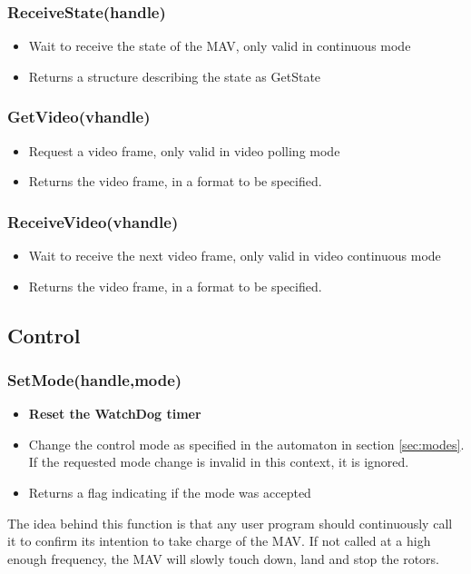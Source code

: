 \documentclass{article}
\begin{document}
\subsubsection{ReceiveState(handle)}
\begin{itemize}
\item Wait to receive the state of the MAV, only valid in continuous mode
\item Returns a structure describing the state as GetState
\end{itemize}

\subsubsection{GetVideo(vhandle)}
\begin{itemize}
\item Request a video frame, only valid in video polling mode
\item Returns the video frame, in a format to be specified.
\end{itemize}

\subsubsection{ReceiveVideo(vhandle)}
\begin{itemize}
\item Wait to receive the next video frame, only valid in video continuous mode
\item Returns the video frame, in a format to be specified.
\end{itemize}

\subsection{Control}
\subsubsection{SetMode(handle,mode)}
\begin{itemize}
\item {\bf Reset the WatchDog timer}
\item Change the control mode as specified in the automaton in section
\ref{sec:modes}. If the requested mode change is invalid in this context, it is
ignored.
\item Returns a flag indicating if the mode was accepted
\end{itemize}
The idea behind this function is that any user program should continuously call
it to confirm its intention to take charge of the MAV. If not called at a high
enough frequency, the MAV will slowly touch down, land and stop the rotors. 
\end{document}
